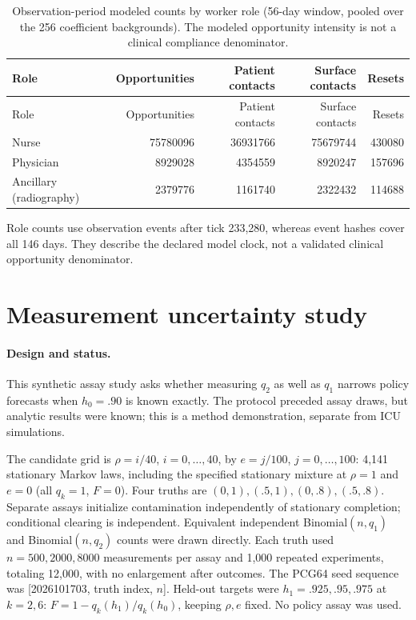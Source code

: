 \documentclass[11pt]{article}
\begin{document}
{\footnotesize
\begin{longtable}{lrrrr}
\caption{Observation-period modeled counts by worker role (56-day window, pooled over the 256 coefficient backgrounds). The modeled opportunity intensity is not a clinical compliance denominator.}\label{tab:roles}\\
\toprule
Role & Opportunities & Patient contacts & Surface contacts & Resets\\
\midrule\endfirsthead
Role & Opportunities & Patient contacts & Surface contacts & Resets\\
\midrule\endhead
Nurse & 75780096 & 36931766 & 75679744 & 430080\\
Physician & 8929028 & 4354559 & 8920247 & 157696\\
Ancillary (radiography) & 2379776 & 1161740 & 2322432 & 114688\\
\bottomrule
\end{longtable}
}
Role counts use observation events after tick 233,280, whereas event hashes cover
all 146 days. They describe the declared model clock, not a validated clinical
opportunity denominator.

\section{Measurement uncertainty study}\label{sec:s-uq}
\paragraph{Design and status.} This synthetic assay study asks whether measuring
$q_2$ as well as $q_1$ narrows policy forecasts when $h_0=.90$ is known exactly.
The protocol preceded assay draws, but analytic results were known;
this is a method demonstration, separate from ICU simulations.

The candidate grid is $\rho=i/40$, $i=0,\ldots,40$, by $e=j/100$,
$j=0,\ldots,100$: 4,141 stationary Markov laws, including the specified stationary
mixture at $\rho=1$ and $e=0$ (all $q_k=1$, $F=0$).
Four truths are $(0,1),(.5,1),(0,.8),(.5,.8)$.
Separate assays initialize contamination independently of stationary completion;
conditional clearing is independent. Equivalent independent
Binomial$(n,q_1)$ and Binomial$(n,q_2)$ counts were drawn directly.
Each truth used $n=500,2000,8000$ measurements per assay and 1,000 repeated
experiments, totaling 12,000, with no enlargement after outcomes.
The PCG64 seed sequence was [2026101703, truth index, $n$].
Held-out targets were $h_1=.925,.95,.975$ at $k=2,6$:
$F=1-q_k(h_1)/q_k(h_0)$, keeping $\rho,e$ fixed. No policy assay was used.
\end{document}
